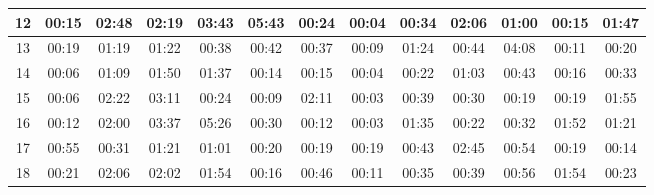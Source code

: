 \begin{center}
\begin{sideways}
\begin{tabular}{|l|l|l|l|l|l|l|l|l|l|l|l|l|}
\hline
\multicolumn{1}{|c|}{12} & \multicolumn{1}{c|}{00:15} & \multicolumn{1}{c|}{02:48} & \multicolumn{1}{c|}{02:19} & \multicolumn{1}{c|}{03:43} & \multicolumn{1}{c|}{05:43} & \multicolumn{1}{c|}{00:24} & \multicolumn{1}{c|}{00:04} & \multicolumn{1}{c|}{00:34} & \multicolumn{1}{c|}{02:06} & \multicolumn{1}{c|}{01:00} & \multicolumn{1}{c|}{00:15} & \multicolumn{1}{c|}{01:47} \\ 
\hline
\multicolumn{1}{|c|}{13} & \multicolumn{1}{c|}{00:19} & \multicolumn{1}{c|}{01:19} & \multicolumn{1}{c|}{01:22} & \multicolumn{1}{c|}{00:38} & \multicolumn{1}{c|}{00:42} & \multicolumn{1}{c|}{00:37} & \multicolumn{1}{c|}{00:09} & \multicolumn{1}{c|}{01:24} & \multicolumn{1}{c|}{00:44} & \multicolumn{1}{c|}{04:08} & \multicolumn{1}{c|}{00:11} & \multicolumn{1}{c|}{00:20} \\ 
\hline
\multicolumn{1}{|c|}{14} & \multicolumn{1}{c|}{00:06} & \multicolumn{1}{c|}{01:09} & \multicolumn{1}{c|}{01:50} & \multicolumn{1}{c|}{01:37} & \multicolumn{1}{c|}{00:14} & \multicolumn{1}{c|}{00:15} & \multicolumn{1}{c|}{00:04} & \multicolumn{1}{c|}{00:22} & \multicolumn{1}{c|}{01:03} & \multicolumn{1}{c|}{00:43} & \multicolumn{1}{c|}{00:16} & \multicolumn{1}{c|}{00:33} \\ 
\hline
\multicolumn{1}{|c|}{15} & \multicolumn{1}{c|}{00:06} & \multicolumn{1}{c|}{02:22} & \multicolumn{1}{c|}{03:11} & \multicolumn{1}{c|}{00:24} & \multicolumn{1}{c|}{00:09} & \multicolumn{1}{c|}{02:11} & \multicolumn{1}{c|}{00:03} & \multicolumn{1}{c|}{00:39} & \multicolumn{1}{c|}{00:30} & \multicolumn{1}{c|}{00:19} & \multicolumn{1}{c|}{00:19} & \multicolumn{1}{c|}{01:55} \\ 
\hline
\multicolumn{1}{|c|}{16} & \multicolumn{1}{c|}{00:12} & \multicolumn{1}{c|}{02:00} & \multicolumn{1}{c|}{03:37} & \multicolumn{1}{c|}{05:26} & \multicolumn{1}{c|}{00:30} & \multicolumn{1}{c|}{00:12} & \multicolumn{1}{c|}{00:03} & \multicolumn{1}{c|}{01:35} & \multicolumn{1}{c|}{00:22} & \multicolumn{1}{c|}{00:32} & \multicolumn{1}{c|}{01:52} & \multicolumn{1}{c|}{01:21} \\ 
\hline
\multicolumn{1}{|c|}{17} & \multicolumn{1}{c|}{00:55} & \multicolumn{1}{c|}{00:31} & \multicolumn{1}{c|}{01:21} & \multicolumn{1}{c|}{01:01} & \multicolumn{1}{c|}{00:20} & \multicolumn{1}{c|}{00:19} & \multicolumn{1}{c|}{00:19} & \multicolumn{1}{c|}{00:43} & \multicolumn{1}{c|}{02:45} & \multicolumn{1}{c|}{00:54} & \multicolumn{1}{c|}{00:19} & \multicolumn{1}{c|}{00:14} \\ 
\hline
\multicolumn{1}{|c|}{18} & \multicolumn{1}{c|}{00:21} & \multicolumn{1}{c|}{02:06} & \multicolumn{1}{c|}{02:02} & \multicolumn{1}{c|}{01:54} & \multicolumn{1}{c|}{00:16} & \multicolumn{1}{c|}{00:46} & \multicolumn{1}{c|}{00:11} & \multicolumn{1}{c|}{00:35} & \multicolumn{1}{c|}{00:39} & \multicolumn{1}{c|}{00:56} & \multicolumn{1}{c|}{01:54} & \multicolumn{1}{c|}{00:23} \\ 

\end{tabular}
\end{sideways}
\end{center}
